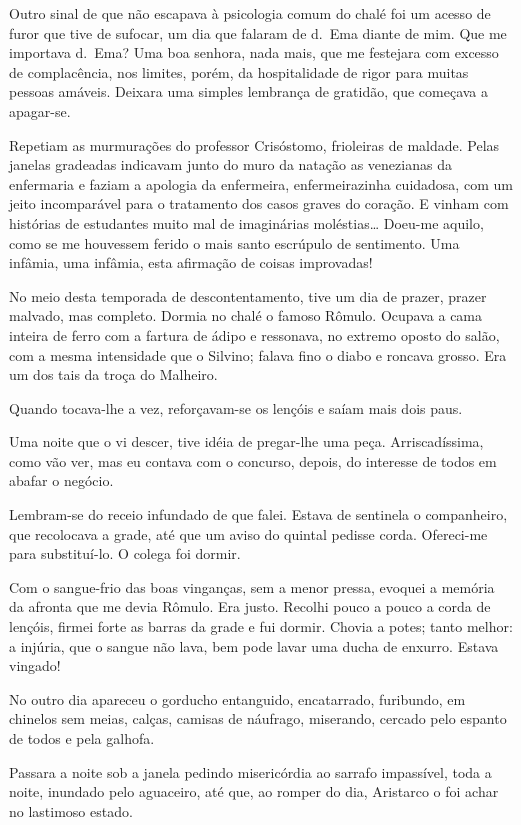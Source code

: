 Outro sinal de que
não escapava à psicologia comum do chalé foi um acesso de furor que
tive de sufocar, um dia que falaram de d.~Ema diante de mim. Que me
importava d.~Ema? Uma boa senhora, nada mais, que me festejara com
excesso de complacência, nos limites, porém, da hospitalidade de rigor
para muitas pessoas amáveis. Deixara uma simples lembrança de gratidão,
que começava a apagar{}-se. 

Repetiam as murmurações do professor
Crisóstomo, frioleiras de maldade. Pelas janelas gradeadas indicavam
junto do muro da natação as venezianas da enfermaria e faziam a
apologia da enfermeira, enfermeirazinha cuidadosa, com um jeito
incomparável para o tratamento dos casos graves do coração. E vinham
com histórias de estudantes muito mal de imaginárias moléstias\ldots
Doeu{}-me aquilo, como se me houvessem ferido o mais santo escrúpulo de
sentimento. Uma infâmia, uma
infâmia, esta afirmação de coisas improvadas! 

No meio desta temporada de
descontentamento, tive um dia de prazer, prazer malvado, mas completo.
Dormia no chalé o famoso Rômulo. Ocupava a cama inteira de ferro com a
fartura de ádipo e ressonava, no extremo oposto do salão, com a mesma
intensidade que o Silvino; falava fino o diabo e roncava grosso. Era um
dos tais da troça do Malheiro. 

Quando tocava{}-lhe a vez,
reforçavam{}-se os lençóis e saíam mais dois paus. 

Uma noite que o vi
descer, tive idéia de pregar{}-lhe uma peça. Arriscadíssima, como vão
ver, mas eu contava com o concurso, depois, do interesse de todos em
abafar o negócio. 

Lembram{}-se do receio infundado de que falei. Estava
de sentinela o companheiro, que recolocava a grade, até que um aviso do
quintal pedisse corda. Ofereci{}-me para substituí{}-lo. O colega foi
dormir. 

Com o sangue{}-frio das boas vinganças, sem a menor pressa,
evoquei a memória da afronta que me devia Rômulo. Era justo. Recolhi
pouco a pouco a corda de lençóis, firmei forte as barras da grade e fui
dormir. Chovia a potes; tanto melhor: a injúria, que o sangue não lava,
bem pode lavar uma ducha de enxurro. Estava vingado! 

No outro dia
apareceu o gorducho entanguido, encatarrado, furibundo, em chinelos sem
meias, calças, camisas de náufrago, miserando, cercado pelo espanto de
todos e pela galhofa. 

Passara a noite sob a janela pedindo misericórdia
ao sarrafo impassível, toda a noite, inundado pelo aguaceiro, até que,
ao romper do dia, Aristarco o foi achar no lastimoso estado. 

